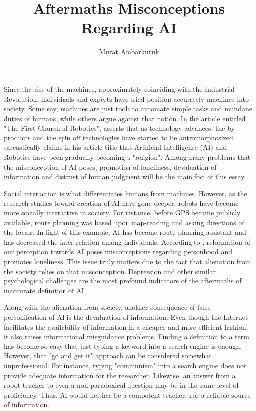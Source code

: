 \documentclass[man]{apa6}
\title{Aftermaths Misconceptions Regarding AI}
\author{Murat Ambarkutuk}
\affiliation{English Language Institute, University of Delaware \\ murata@udel.edu}
\begin{document}
\maketitle
Since the rise of the machines, approximately coinciding with the Industrial Revolution, individuals and experts have tried position accurately machines into society. Some say, machines are just tools to automate simple tasks and mundane duties of humans, while others argue against that notion. In the article entitled "The First Church of Robotics",  asserts that as technology advances, the by-products and the spin off technologies have started to be antromorphosized.  sarcastically claims in his article title that Artificial Intelligence (AI)  and Robotics have been gradually becoming a "religion". Among many problems that the misconception of AI poses, promotion of loneliness, devaluation of information and distrust of human judgment will be the main foci of this essay.\par
Social interaction is what differentiates humans from machines. However, as the research studies toward creation of AI have gone deeper, robots have become more socially interactive in society. For instance, before GPS became publicly available, route planning was based upon map-reading and asking directions of the locals. In light of this example, AI has become route planning assistant and has decreased the inter-relation among individuals. According to , reformation of our perception towards AI poses misconceptions regarding personhood and promotes loneliness. This issue truly matters due to the fact that alienation from the society relies on that misconception. Depression and other similar psychological challenges are the most profound indicators of the aftermaths of inaccurate definition of AI.\par
Along with the alienation from society, another consequence of false personifcation of AI is the devaluation of information. Even though the Internet facilitates the availability of information in a cheaper and more efficient fashion, it also raises informational misguidance problems. Finding a definition to a term has become so easy that just typing a keyword into a search engine is enough. However, that "go and get it" approach can be considered somewhat unprofessional. For instance, typing "communism" into a search engine does not provide adequate information for the researcher. Likewise, an answer from a robot teacher to even a non-paradoxical question may be in the same level of proficiency. Thus, AI would neither be a competent teacher, nor a reliable source of information.\par



\end{document}
